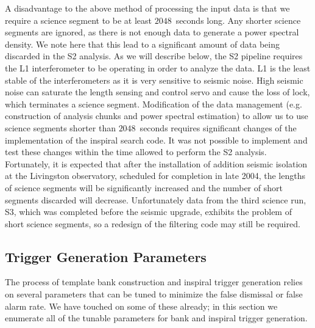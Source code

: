 A disadvantage to the above method of processing the input data is that we
require a science segment to be at least $2048$~seconds long. Any shorter
science segments are ignored, as there is not enough data to generate a power
spectral density. We note here that this lead to a significant amount of data
being discarded in the S2 analysis. As we will describe below, the S2 pipeline
requires the L1 interferometer to be operating in order to analyze the data.
L1 is the least stable of the interferometers as it is very sensitive to
seismic noise. High seismic noise can saturate the length sensing and control
servo and cause the loss of lock, which terminates a science segment.
Modification of the data management (e.g. construction of analysis chunks and
power spectral estimation) to allow us to use science segments shorter than
$2048$~seconds requires significant changes of the implementation of the
inspiral search code. It was not possible to implement and test these changes
within the time allowed to perform the S2 analysis. Fortunately, it is
expected that after the installation of addition seismic isolation at the
Livingston observatory, scheduled for completion in late 2004, the lengths of
science segments will be significantly increased and the number of short
segments discarded will decrease. Unfortunately data from the third science
run, S3, which was completed before the seismic upgrade, exhibits the problem
of short science segments, so a redesign of the filtering code may still be
required.


\subsection{Trigger Generation Parameters}
\label{ss:triggerparameters}

The process of template bank construction and inspiral trigger generation
relies on several parameters that can be tuned to minimize the false dismissal
or false alarm rate. We have touched on some of these already; in this section
we enumerate all of the tunable parameters for bank and inspiral trigger
generation.

